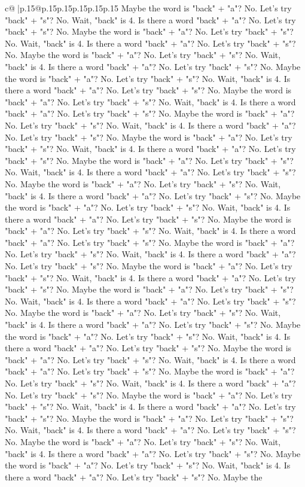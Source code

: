 \documentclass{article}
\begin{document}
{\begin{supertabular}{c@{$\;$}|p{.15\linewidth}@{}p{.15\linewidth}p{.15\linewidth}p{.15\linewidth}p{.15\linewidth}p{.15\linewidth}}
{{{Maybe the word is "back" + "a"? No. Let's try "back" + "s"? No. Wait, "back" is 4. Is there a word "back" + "a"? No. Let's try "back" + "s"? No. Maybe the word is "back" + "a"? No. Let's try "back" + "s"? No. Wait, "back" is 4. Is there a word "back" + "a"? No. Let's try "back" + "s"? No. Maybe the word is "back" + "a"? No. Let's try "back" + "s"? No. Wait, "back" is 4. Is there a word "back" + "a"? No. Let's try "back" + "s"? No. Maybe the word is "back" + "a"? No. Let's try "back" + "s"? No. Wait, "back" is 4. Is there a word "back" + "a"? No. Let's try "back" + "s"? No. Maybe the word is "back" + "a"? No. Let's try "back" + "s"? No. Wait, "back" is 4. Is there a word "back" + "a"? No. Let's try "back" + "s"? No. Maybe the word is "back" + "a"? No. Let's try "back" + "s"? No. Wait, "back" is 4. Is there a word "back" + "a"? No. Let's try "back" + "s"? No. Maybe the word is "back" + "a"? No. Let's try "back" + "s"? No. Wait, "back" is 4. Is there a word "back" + "a"? No. Let's try "back" + "s"? No. Maybe the word is "back" + "a"? No. Let's try "back" + "s"? No. Wait, "back" is 4. Is there a word "back" + "a"? No. Let's try "back" + "s"? No. Maybe the word is "back" + "a"? No. Let's try "back" + "s"? No. Wait, "back" is 4. Is there a word "back" + "a"? No. Let's try "back" + "s"? No. Maybe the word is "back" + "a"? No. Let's try "back" + "s"? No. Wait, "back" is 4. Is there a word "back" + "a"? No. Let's try "back" + "s"? No. Maybe the word is "back" + "a"? No. Let's try "back" + "s"? No. Wait, "back" is 4. Is there a word "back" + "a"? No. Let's try "back" + "s"? No. Maybe the word is "back" + "a"? No. Let's try "back" + "s"? No. Wait, "back" is 4. Is there a word "back" + "a"? No. Let's try "back" + "s"? No. Maybe the word is "back" + "a"? No. Let's try "back" + "s"? No. Wait, "back" is 4. Is there a word "back" + "a"? No. Let's try "back" + "s"? No. Maybe the word is "back" + "a"? No. Let's try "back" + "s"? No. Wait, "back" is 4. Is there a word "back" + "a"? No. Let's try "back" + "s"? No. Maybe the word is "back" + "a"? No. Let's try "back" + "s"? No. Wait, "back" is 4. Is there a word "back" + "a"? No. Let's try "back" + "s"? No. Maybe the word is "back" + "a"? No. Let's try "back" + "s"? No. Wait, "back" is 4. Is there a word "back" + "a"? No. Let's try "back" + "s"? No. Maybe the word is "back" + "a"? No. Let's try "back" + "s"? No. Wait, "back" is 4. Is there a word "back" + "a"? No. Let's try "back" + "s"? No. Maybe the word is "back" + "a"? No. Let's try "back" + "s"? No. Wait, "back" is 4. Is there a word "back" + "a"? No. Let's try "back" + "s"? No. Maybe the word is "back" + "a"? No. Let's try "back" + "s"? No. Wait, "back" is 4. Is there a word "back" + "a"? No. Let's try "back" + "s"? No. Maybe the word is "back" + "a"? No. Let's try "back" + "s"? No. Wait, "back" is 4. Is there a word "back" + "a"? No. Let's try "back" + "s"? No. Maybe the word is "back" + "a"? No. Let's try "back" + "s"? No. Wait, "back" is 4. Is there a word "back" + "a"? No. Let's try "back" + "s"? No. Maybe the word is "back" + "a"? No. Let's try "back" + "s"? No. Wait, "back" is 4. Is there a word "back" + "a"? No. Let's try "back" + "s"? No. Maybe the }}}
\end{supertabular}}
\end{document}

